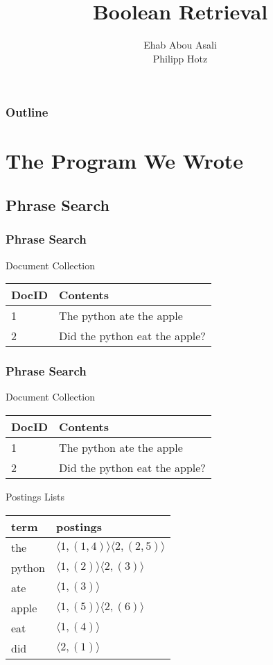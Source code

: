 \documentclass{beamer}
\title{Boolean Retrieval}
\author{Ehab Abou Asali\\ Philipp Hotz}
\begin{document}
\begin{frame}

  \frametitle{Outline}
  \tableofcontents[pausesections]
\end{frame}


\section{The Program We Wrote}

\subsection{Phrase Search}

\begin{frame}
  \frametitle{Phrase Search}

  \begin{block}{Document Collection}

    \begin{tabular}{ l | l }
      DocID & Contents \\ \hline
      1 & The python ate the apple \\
      2 & Did the python eat the apple? \\
    \end{tabular}

  \end{block}

\end{frame}

\begin{frame}
  \frametitle{Phrase Search}

  \begin{block}{Document Collection}

    \begin{tabular}{ l | l }
      DocID & Contents \\ \hline
      1 & The python ate the apple \\
      2 & Did the python eat the apple? \\
    \end{tabular}

  \end{block}

  \begin{block}{Postings Lists}
    \begin{tabular}{ l | l }
      term & postings \\ \hline
      the & $ \langle 1,(1,4) \rangle \langle 2,(2,5) \rangle $ \\
      python & $ \langle 1,(2) \rangle \langle 2,(3) \rangle $ \\
      ate & $ \langle 1,(3) \rangle $ \\
      apple & $ \langle 1,(5) \rangle \langle 2,(6) \rangle $ \\
      eat & $ \langle 1,(4) \rangle $ \\
      did & $ \langle 2,(1) \rangle $ \\
    \end{tabular}
  \end{block}

\end{frame}
\end{document}
